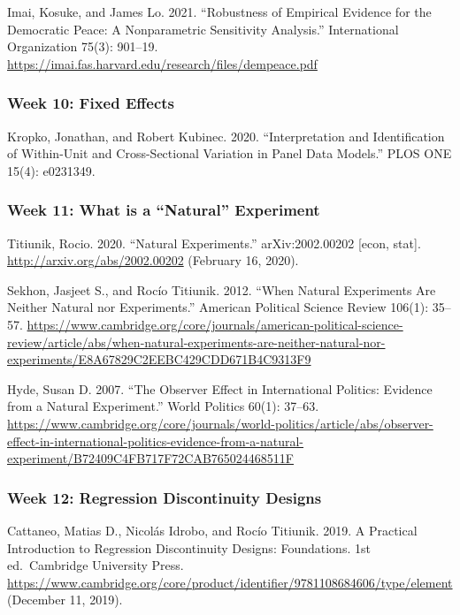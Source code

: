 \documentclass[
  11pt,
]{article}
\begin{document}
Imai, Kosuke, and James Lo. 2021. ``Robustness of Empirical Evidence for
the Democratic Peace: A Nonparametric Sensitivity Analysis.''
International Organization 75(3): 901--19.
\url{https://imai.fas.harvard.edu/research/files/dempeace.pdf}

\hypertarget{week-10-fixed-effects}{%
\subsubsection{Week 10: Fixed Effects}\label{week-10-fixed-effects}}

Kropko, Jonathan, and Robert Kubinec. 2020. ``Interpretation and
Identification of Within-Unit and Cross-Sectional Variation in Panel
Data Models.'' PLOS ONE 15(4): e0231349.

\hypertarget{week-11-what-is-a-natural-experiment}{%
\subsubsection{Week 11: What is a ``Natural''
Experiment}\label{week-11-what-is-a-natural-experiment}}

Titiunik, Rocio. 2020. ``Natural Experiments.'' arXiv:2002.00202
{[}econ, stat{]}. \url{http://arxiv.org/abs/2002.00202} (February 16,
2020).

Sekhon, Jasjeet S., and Rocío Titiunik. 2012. ``When Natural Experiments
Are Neither Natural nor Experiments.'' American Political Science Review
106(1): 35--57.
\url{https://www.cambridge.org/core/journals/american-political-science-review/article/abs/when-natural-experiments-are-neither-natural-nor-experiments/E8A67829C2EEBC429CDD671B4C9313F9}

Hyde, Susan D. 2007. ``The Observer Effect in International Politics:
Evidence from a Natural Experiment.'' World Politics 60(1): 37--63.
\url{https://www.cambridge.org/core/journals/world-politics/article/abs/observer-effect-in-international-politics-evidence-from-a-natural-experiment/B72409C4FB717F72CAB765024468511F}

\hypertarget{week-12-regression-discontinuity-designs}{%
\subsubsection{Week 12: Regression Discontinuity
Designs}\label{week-12-regression-discontinuity-designs}}

Cattaneo, Matias D., Nicolás Idrobo, and Rocío Titiunik. 2019. A
Practical Introduction to Regression Discontinuity Designs: Foundations.
1st ed.~Cambridge University Press.
\url{https://www.cambridge.org/core/product/identifier/9781108684606/type/element}
(December 11, 2019).
\end{document}
